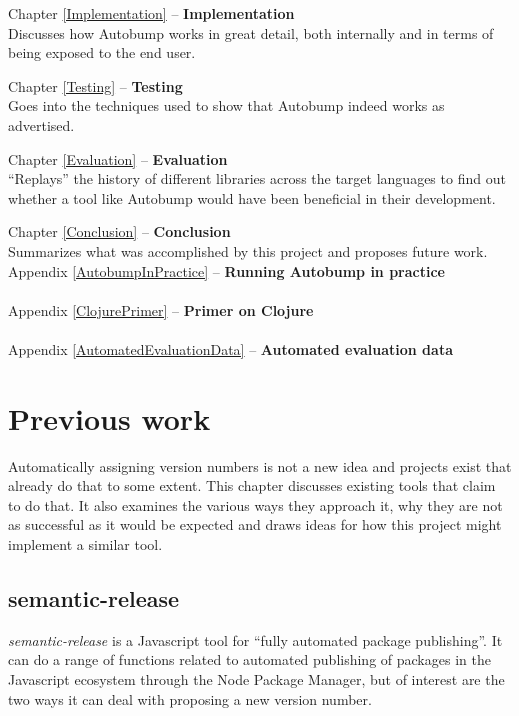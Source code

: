 \documentclass{l4proj}
\begin{document}
\noindent Chapter \ref{Implementation} -- \textbf{Implementation} \\
Discusses how Autobump works in great detail, both internally and
in terms of being exposed to the end user.

\noindent Chapter \ref{Testing} -- \textbf{Testing} \\
Goes into the techniques used to show that Autobump indeed works
as advertised.

\noindent Chapter \ref{Evaluation} -- \textbf{Evaluation} \\
``Replays'' the history of different libraries across the target
languages to find out whether a tool like Autobump would have been
beneficial in their development.

\noindent Chapter \ref{Conclusion} -- \textbf{Conclusion} \\
Summarizes what was accomplished by this project and proposes future
work. \\

\noindent Appendix \ref{AutobumpInPractice} -- \textbf{Running
Autobump in practice} \\\\
\noindent Appendix \ref{ClojurePrimer} -- \textbf{Primer on Clojure} \\\\
\noindent Appendix \ref{AutomatedEvaluationData} -- \textbf{Automated
evaluation data}

\chapter{Previous work}
\label{PreviousWork}

Automatically assigning version numbers is not a new idea and projects
exist that already do that to some extent.
This chapter discusses existing tools that claim to do that. It also
examines the various ways they approach it, why they are not as
successful as it would be expected and draws ideas for how this project
might implement a similar tool.

\section{semantic-release}

\textit{semantic-release} \cite{SemanticRelease} is a Javascript tool
for ``fully automated package publishing''. It can do a range of
functions related to automated publishing of packages in the
Javascript ecosystem through the Node Package Manager, but of interest
are the two ways it can deal with proposing a new version number.
\end{document}
